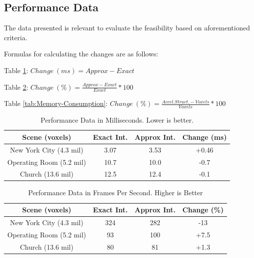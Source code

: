 \documentclass[12pt]{article}
\begin{document}
\subsection{Performance Data}

The data presented is relevant to evaluate the feasibility based on aforementioned criteria.

Formulas for calculating the changes are as follows:

Table \ref{tab:Performance-Milliseconds}:
$Change ~ (ms) = Approx - Exact$

Table \ref{tab:Performance-Frames}:
$Change ~ (\%) = \frac{Approx - Exact}{Exact} * 100$

Table \ref{tab:Memory-Consumption}:
$Change ~ (\%) = \frac{Accel. Struct. - Voxels}{Voxels} * 100$

\begin{table}[H]
    \centering
    \caption{Performance Data in Milliseconds. Lower is better.}
    \vspace{0.5cm}
    \label{tab:Performance-Milliseconds}
    \begin{tabular}{c||c|c|c|}
        Scene (voxels)           & Exact Int. & Approx Int. & Change (ms) \\ \toprule
        New York City (4.3 mil)  & 3.07       & 3.53        & +0.46       \\
        Operating Room (5.2 mil) & 10.7       & 10.0        & -0.7        \\
        Church (13.6 mil)        & 12.5       & 12.4        & -0.1        \\
    \end{tabular}
\end{table}

\begin{table}[H]
    \centering
    \caption{Performance Data in Frames Per Second. Higher is Better}
    \vspace{0.5cm}
    \label{tab:Performance-Frames}
    \begin{tabular}{c||c|c|c|}
        Scene (voxels)           & Exact Int. & Approx Int. & Change (\%) \\ \toprule
        New York City (4.3 mil)  & 324        & 282         & -13         \\
        Operating Room (5.2 mil) & 93         & 100         & +7.5        \\
        Church (13.6 mil)        & 80         & 81          & +1.3        \\
    \end{tabular}
\end{table}
\end{document}
